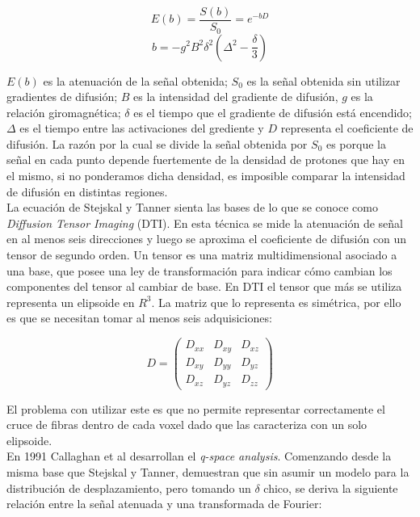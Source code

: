 $$ E(b) = \frac{S(b)}{S_0} = e^{-b D} \label{eq:stejkal}$$
$$ b = -g^2 B^2 \delta^2 (\Delta^2 - \frac{\delta}{3}) $$

$E(b)$ es la atenuaci\'on de la se\~nal obtenida; $S_0$ es la se\~nal obtenida
sin utilizar gradientes de difusi\'on; $B$ es la intensidad del gradiente de
difusi\'on, $g$ es la relaci\'on giromagn\'etica;  $\delta$ es el tiempo que el
gradiente de difusi\'on est\'a encendido; $\Delta$ es el tiempo entre las 
activaciones del grediente y $D$ representa el coeficiente de difusi\'on.
La raz\'on por la cual se divide la se\~nal obtenida por $S_0$ es porque la
se\~nal en cada punto depende fuertemente de la densidad de protones que hay
en el mismo, si no ponderamos dicha densidad, es imposible comparar la intensidad
de difusi\'on en distintas regiones. \\

La ecuaci\'on de Stejskal y Tanner sienta las bases de lo que se conoce como 
\textit{Diffusion Tensor Imaging} (DTI). En esta t\'ecnica se mide la atenuaci\'on
de se\~nal en al menos seis direcciones y luego se aproxima el coeficiente de 
difusi\'on con un tensor de segundo orden. Un tensor es una matriz multidimensional 
asociado a una base, que posee una ley de transformaci\'on  para indicar  c\'omo
cambian los componentes del tensor al cambiar de base. En DTI el tensor que m\'as
se utiliza representa un elipsoide en $R^3$. La matriz que lo representa
es  sim\'etrica, por ello es que se necesitan tomar al menos seis adquisiciones: 

$$
    D =
    \begin{pmatrix}
             D_{xx} & D_{xy} & D_{xz} \\
             D_{xy} & D_{yy} & D_{yz} \\
             D_{xz} & D_{yz} & D_{zz}    
    \end{pmatrix}
$$

\vspace{0.1cm}

El problema con utilizar este es que no permite representar correctamente
el cruce de fibras dentro de cada voxel dado que las caracteriza con un solo
elipsoide.\\

En 1991 Callaghan et al \cite{Callaghan1991} desarrollan el \textit{q-space analysis}.
Comenzando desde la misma base que Stejskal y Tanner, demuestran que sin asumir un
modelo para la distribuci\'on de desplazamiento, pero tomando un $\delta$ chico,
se deriva la siguiente relaci\'on entre la se\~nal atenuada y una transformada de
Fourier:

